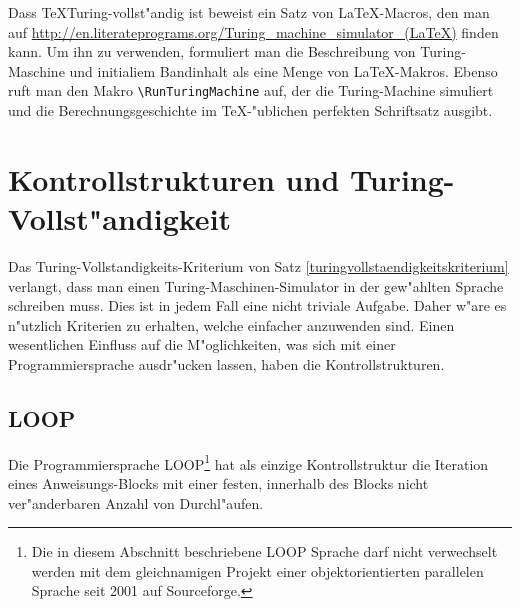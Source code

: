 Dass \TeX Turing-vollst"andig ist beweist ein Satz von \LaTeX-Macros, den
man auf
\url{http://en.literateprograms.org/Turing\_machine\_simulator\_(LaTeX)}
finden kann.
Um ihn zu verwenden, formuliert man die Beschreibung
von Turing-Maschine und initialiem Bandinhalt als eine Menge von
\LaTeX-Makros. Ebenso ruft man den Makro \verb+\RunTuringMachine+ auf,
der die Turing-Machine simuliert und die Berechnungsgeschichte im
\TeX-"ublichen perfekten Schriftsatz ausgibt.



\section{Kontrollstrukturen und Turing-Vollst"andigkeit}
Das Turing-Vollstandigkeits-Kriterium von Satz
\ref{turingvollstaendigkeitskriterium} verlangt, dass man einen
Turing-Maschinen-Simulator in der gew"ahlten Sprache schreiben muss.
Dies ist in jedem Fall eine nicht triviale Aufgabe.
Daher w"are es n"utzlich Kriterien zu erhalten, welche einfacher
anzuwenden sind. Einen wesentlichen Einfluss auf die M"oglichkeiten,
was sich mit einer Programmiersprache ausdr"ucken lassen, haben die
Kontrollstrukturen.

\subsection{LOOP}
Die Programmiersprache
LOOP\footnote{Die in diesem Abschnitt beschriebene
LOOP Sprache darf nicht verwechselt werden mit dem gleichnamigen
Projekt einer objektorientierten parallelen Sprache seit
2001 auf Sourceforge.}
hat als einzige Kontrollstruktur die
Iteration eines Anweisungs-Blocks mit einer festen, innerhalb des
Blocks nicht ver"anderbaren Anzahl von Durchl"aufen.

